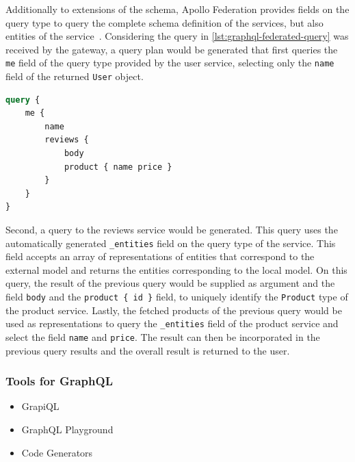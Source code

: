 Additionally to extensions of the schema, Apollo Federation provides fields on the query type to query the complete schema definition of the services, but also entities of the service~\cite{MDGa}.
Considering the query in \autoref{lst:graphql-federated-query} was received by the gateway, a query plan would be generated that first queries the \texttt{me} field of the query type provided by the user service, selecting only the \texttt{name} field of the returned \texttt{User} object.

\begin{lstlisting}[caption={Query to a Federated GraphQL \ac{API}~\cite{MDG}}, language=graphql, label={lst:graphql-federated-query}]
query {
    me {
        name
        reviews {
            body
            product { name price }
        }
    }
}
\end{lstlisting}

Second, a query to the reviews service would be generated.
This query uses the automatically generated \texttt{\_entities} field on the query type of the service.
This field accepts an array of representations of entities that correspond to the external model and returns the entities corresponding to the local model.
On this query, the result of the previous query would be supplied as argument and the field \texttt{body} and the \texttt{product \{ id \}} field, to uniquely identify the \texttt{Product} type of the product service.
Lastly, the fetched products of the previous query would be used as representations to query the \texttt{\_entities} field of the product service and select the field \texttt{name} and \texttt{price}.
The result can then be incorporated in the previous query results and the overall result is returned to the user.

\subsubsection{Tools for GraphQL}

\begin{itemize}
    \item GrapiQL
    \item GraphQL Playground
    \item Code Generators
\end{itemize}